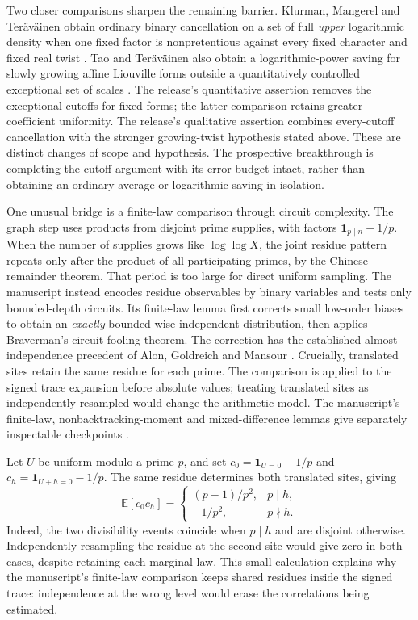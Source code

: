 Two closer comparisons sharpen the remaining barrier. Klurman, Mangerel
and Ter\"av\"ainen obtain ordinary binary cancellation on a set of full
\emph{upper} logarithmic density when one fixed factor is nonpretentious
against every fixed character and fixed real twist
\cite[Definition~1.1 and Theorem~1.2]{arithKMT2023}.
Tao and Ter\"av\"ainen also obtain a logarithmic-power saving for slowly
growing affine Liouville forms outside a quantitatively controlled
exceptional set of scales \cite[Theorem~3.1 and Remarks~3.2]{arithTT2026}.
The release's quantitative assertion removes the exceptional cutoffs for
fixed forms; the latter comparison retains greater coefficient uniformity.
The release's qualitative assertion combines every-cutoff cancellation with the
stronger growing-twist hypothesis stated above. These are distinct changes
of scope and hypothesis. The prospective breakthrough is completing the
cutoff argument with its error budget intact, rather than obtaining an
ordinary average or logarithmic saving in isolation.

One unusual bridge is a finite-law comparison through circuit complexity.
The graph step uses products from disjoint prime supplies, with factors
$\mathbf1_{p\mid n}-1/p$. When the number of supplies grows like
$\log\log X$, the joint residue pattern repeats only after the product
of all participating primes, by the Chinese remainder theorem. That
period is too large for direct uniform sampling. The manuscript instead encodes residue observables by binary
variables and tests only bounded-depth circuits. Its finite-law lemma first
corrects small low-order biases to obtain an \emph{exactly} bounded-wise
independent distribution, then applies Braverman's circuit-fooling theorem.
The correction has the established almost-independence precedent of Alon,
Goldreich and Mansour \cite{arithAGM2003,arithBraverman2010}. Crucially,
translated sites retain the same residue for each prime. The comparison is
applied to the signed trace expansion before absolute values; treating
translated sites as independently resampled would change the arithmetic
model. The manuscript's finite-law, nonbacktracking-moment and
mixed-difference lemmas give separately inspectable checkpoints
\cite{arithOpenAI007}.

\begin{example}
Let $U$ be uniform modulo a prime $p$, and set
$c_0=\mathbf1_{U=0}-1/p$ and $c_h=\mathbf1_{U+h=0}-1/p$.
The same residue determines both translated sites, giving
\[
 \mathbb E[c_0c_h]=
 \begin{cases}
 (p-1)/p^2,&p\mid h,\\
 -1/p^2,&p\nmid h.
 \end{cases}
\]
Indeed, the two divisibility events coincide when $p\mid h$ and are
disjoint otherwise. Independently resampling the residue at the second
site would give zero in both cases, despite retaining each marginal
law. This small calculation explains why the manuscript's finite-law
comparison keeps shared residues inside the signed trace: independence
at the wrong level would erase the correlations being estimated.
\end{example}

